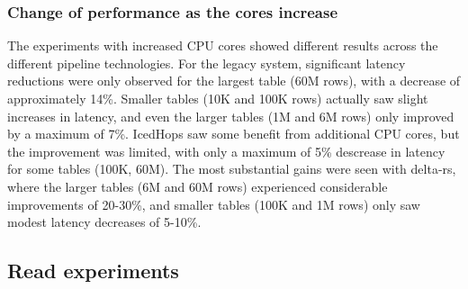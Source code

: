 \subsubsection*{Change of performance as the  cores increase}
The experiments with increased \gls{CPU} cores showed different results across the different pipeline technologies.  For the legacy system, significant latency reductions were only observed for the largest table (60M rows), with a decrease of approximately 14\%. Smaller tables (10K and 100K rows) actually saw slight increases in latency, and even the larger tables (1M and 6M rows) only improved by a maximum of 7\%. 
IcedHops saw some benefit from additional \gls{CPU} cores, but the improvement was limited, with only a maximum of 5\% descrease in latency for some tables (100K, 60M). 
The most substantial gains were seen with delta-rs, where the larger tables (6M and 60M rows) experienced considerable improvements of 20-30\%, and smaller tables (100K and 1M rows) only saw modest latency decreases of 5-10\%.



\subsection{Read experiments}

